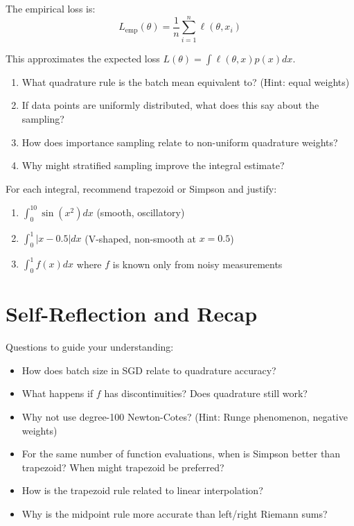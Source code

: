 \vspace{2em}
 The empirical loss is:
\begin{equation}
    L_{\text{emp}}(\theta) = \frac{1}{n}\sum_{i=1}^n \ell(\theta, x_i)
\end{equation}

This approximates the expected loss $L(\theta) = \int \ell(\theta, x) p(x) dx$.

\begin{enumerate}[label=(\alph*)]
    \item What quadrature rule is the batch mean equivalent to? (Hint: equal weights)
    \item If data points are uniformly distributed, what does this say about the sampling?
    \item How does importance sampling relate to non-uniform quadrature weights?
    \item Why might stratified sampling improve the integral estimate?
\end{enumerate}


\vspace{2em}
 For each integral, recommend trapezoid or Simpson and justify:
\begin{enumerate}[label=(\alph*)]
    \item $\int_0^{10} \sin(x^2) dx$ (smooth, oscillatory)
    \item $\int_0^1 |x - 0.5| dx$ (V-shaped, non-smooth at $x = 0.5$)
    \item $\int_0^1 f(x) dx$ where $f$ is known only from noisy measurements
\end{enumerate}




\newpage
\section{Self-Reflection and Recap}

 Questions to guide your understanding:
\begin{itemize}
    \item How does batch size in SGD relate to quadrature accuracy?
    \item What happens if $f$ has discontinuities? Does quadrature still work?
    \item Why not use degree-100 Newton-Cotes? (Hint: Runge phenomenon, negative weights)
    \item For the same number of function evaluations, when is Simpson better than trapezoid? When might trapezoid be preferred?
    \item How is the trapezoid rule related to linear interpolation?
    \item Why is the midpoint rule more accurate than left/right Riemann sums?
\end{itemize}


